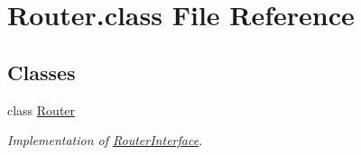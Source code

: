 \hypertarget{Router_8class}{\section{Router.\-class File Reference}
\label{Router_8class}
}
\subsection*{Classes}
\begin{DoxyCompactItemize}
\item 
class \hyperlink{classRouter}{Router}
\begin{DoxyCompactList}\small\item\em Implementation of \hyperlink{interfaceRouterInterface}{Router\-Interface}. \end{DoxyCompactList}\end{DoxyCompactItemize}
